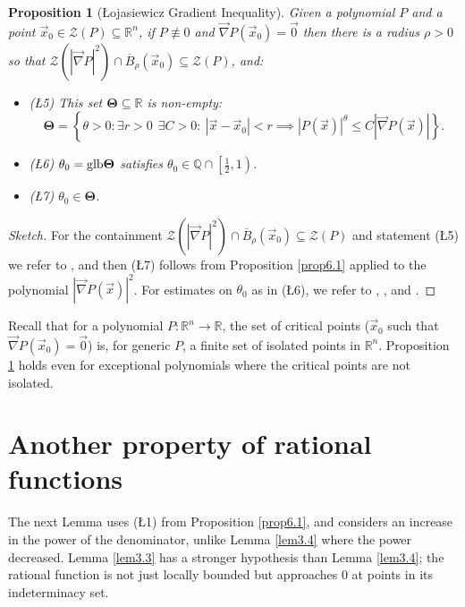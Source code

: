 \documentclass[12pt]{amsart}
\newtheorem{prop}[thm]{Proposition}
\theoremstyle{definition}
\theoremstyle{remark}
\numberwithin{equation}{section}
\newcommand{\re}{\mathbb{R}}
\newcommand{\qu}{\mathbb{Q}}
\newcommand{\vv}{\mathcal{Z}}
\newcommand{\glb}{\mbox{\rm glb}}
\begin{document}
\begin{prop}[\L ojasiewicz Gradient Inequality]\label{prop6.2}
  Given a polynomial $P$ and a point $\vec x_0\in\vv(P)\subseteq\re^n$, if $P\not\equiv0$ and $\vec\nabla P(\vec x_0)=\vec0$ then there is a radius $\rho>0$ so that $\vv(|\vec\nabla P|^2)\cap\overline B_\rho(\vec x_0)\subseteq\vv(P)$, and:
  \begin{itemize}
    \item {\rm{(\L5)}} This set ${\mathbf\Theta}\subseteq\re$ is non-empty:
    \begin{equation}\label{eq6.4}
  {\mathbf\Theta}=\left\{\theta>0:\exists r>0\ \ \exists C>0 : \  |\vec x-\vec x_0|<r\implies|P(\vec x)|^\theta\le C\left|\vec\nabla P(\vec x)\right|\right\}.\nonumber
 \end{equation}
   \item {\rm{(\L6)}} $\theta_0=\glb{\mathbf\Theta}$ satisfies $\theta_0\in\qu\cap\left[\frac12,1\right)$. %
    \item {\rm{(\L7)}} $\theta_0\in{\mathbf\Theta}$.
  \end{itemize}
\end{prop}
\begin{proof}[Sketch]
  For the containment $\vv(|\vec\nabla P|^2)\cap\overline B_\rho(\vec x_0)\subseteq\vv(P)$ and statement (\L5) we refer to \cite{bm}, and then (\L7) follows from Proposition \ref{prop6.1} applied to the polynomial $\left|\vec\nabla P(\vec x)\right|^2$.  For estimates on $\theta_0$ as in (\L6), we refer to \cite{dk}, \cite{f}, and \cite{ouss1}.
\end{proof}
Recall that for a polynomial $P:\re^n\to\re$, the set of critical points ($\vec x_0$ such that $\vec\nabla P(\vec x_0)=\vec0$) is, for generic $P$, a finite set of isolated points in $\re^n$.   Proposition \ref{prop6.2} holds even for exceptional polynomials where the critical points are not isolated.

\section{Another property of rational functions}

The next Lemma uses (\L1) from Proposition \ref{prop6.1}, and considers an increase in the power of the denominator, unlike Lemma \ref{lem3.4} where the power decreased.  Lemma \ref{lem3.3} has a stronger hypothesis than Lemma \ref{lem3.4}; the rational function is not just locally bounded but approaches $0$ at points in its indeterminacy set. 
\end{document}
